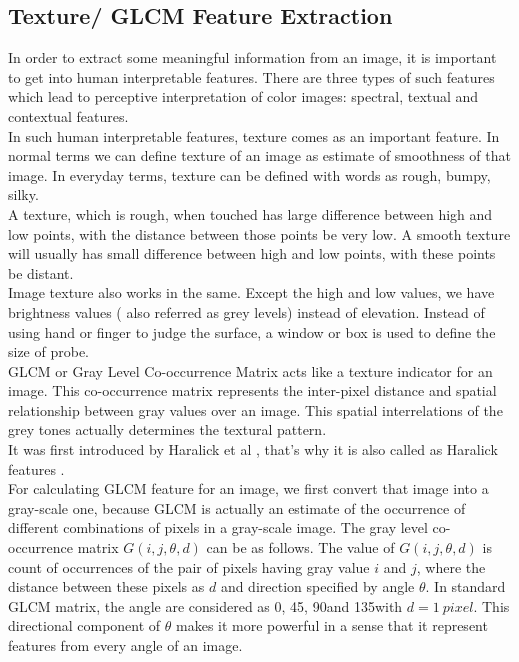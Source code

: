 \subsection{Texture/ GLCM Feature Extraction}
 In order to extract some meaningful information from an image, it is important to get into human interpretable features. There are three types of such features which lead to perceptive interpretation of color images: spectral, textual and contextual features.\\
  In such human interpretable features, texture comes as an important feature. In normal terms we can define texture of an image as estimate of smoothness of that image. In everyday terms, texture can be defined with words as rough, bumpy, silky.\\
   A texture, which is rough, when touched has large difference between high and low points, with the distance between those points be very low. A smooth texture will usually has small difference between high and low points, with these points be distant.\\
   Image texture also works in the same. Except the high and low values, we have brightness values ( also referred as grey levels) instead of elevation. Instead of using hand or finger to judge the surface, a window or box is used to define the size of probe.\\
  GLCM or Gray Level Co-occurrence Matrix acts like a texture indicator for an image. This co-occurrence matrix represents the inter-pixel distance and spatial relationship between gray values over an image. This spatial interrelations of the grey tones actually determines the textural pattern.\\
  It was first introduced by Haralick et al \cite{haralick}, that's why it is also called as Haralick features . \\
  For calculating GLCM feature for an image, we first convert that image into a gray-scale one, because GLCM is actually an estimate of the occurrence of different combinations of pixels in a gray-scale image. The gray level co-occurrence matrix $G(i,j,\theta, d)$ can be as follows. The value of $G(i,j,\theta, d)$ is count of occurrences of the pair of pixels having gray value $i$ and $j$, where the distance between these pixels as $d$ and direction specified by angle $\theta$. In standard GLCM matrix, the angle are considered as 0\textdegree, 45\textdegree, 90\textdegree and 135\textdegree with $d=1\ pixel$. This directional component of $\theta$ makes it more powerful in a sense that it represent features from every angle of an image.\\
